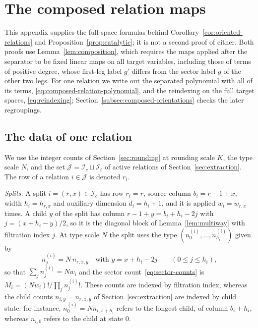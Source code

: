\section{The composed relation maps}
\label{sec:composed-maps}

This appendix supplies the full-space formulas behind
Corollary~\ref{cor:oriented-relations} and
Proposition~\ref{prop:catalytic}; it is not a second proof of either.
Both proofs use Lemma~\ref{lem:composition}, which requires the maps
applied after the separator to be fixed linear maps on all target
variables, including those of terms of positive degree, whose first-leg
label \(g'\) differs from the sector label \(g\) of the other two legs.
For one relation we write out the separated polynomial with all of its
terms, \eqref{eq:composed-relation-polynomial}, and the reindexing on the
full target spaces, \eqref{eq:reindexing};
Section~\ref{subsec:composed-orientations} checks the later regroupings.

\subsection{The data of one relation}

We use the integer counts of Section~\ref{sec:rounding} at rounding scale
\(K\), the type scale \(N\), and the set \(\mathcal J=\mathcal
I_c\sqcup\mathcal I_t\) of active relations of
Section~\ref{sec:extraction}. The row of a relation \(i\in\mathcal J\) is
denoted \(r_i\).

\emph{Splits.} A split \(i=(r,x)\in\mathcal I_c\) has row \(r_i=r\), source
column \(b_i=r-1+x\), width \(h_i=h_{r,x}\) and auxiliary dimension
\(d_i=h_i+1\), and it is applied \(w_i=w_{r,x}\) times. A child \(y\) of
the split has column \(r-1+y=b_i+h_i-2j\) with \(j=(x+h_i-y)/2\), so it is
the diagonal block of Lemma~\ref{lem:multiway} with filtration index
\(j\). At type scale \(N\) the split uses the type
\((n^{(i)}_0,\ldots,n^{(i)}_{h_i})\) given by
\begin{equation}\label{eq:filtration-counts}
 n^{(i)}_j=N\,n_{r,x,y}\quad\text{with }y=x+h_i-2j
 \qquad(0\le j\le h_i),
\end{equation}
so that \(\sum_jn^{(i)}_j=Nw_i\) and the sector
count~\eqref{eq:sector-counts} is \(M_i=(Nw_i)!/\prod_jn^{(i)}_j!\). These
counts are indexed by filtration index, whereas the child counts
\(n_{i,y}=n_{r,x,y}\) of Section~\ref{sec:extraction} are indexed by child
state: for instance, \(n^{(i)}_0=Nn_{i,x+h_i}\) refers to the longest
child, of column \(b_i+h_i\), whereas \(n_{i,0}\) refers to the child at
state \(0\).

